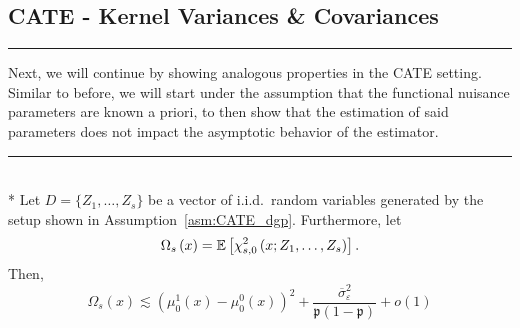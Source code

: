 \subsection{CATE - Kernel Variances \& Covariances}
\hrule
Next, we will continue by showing analogous properties in the CATE setting.
Similar to before, we will start under the assumption that the functional nuisance parameters are known a priori, to then show that the estimation of said parameters does not impact the asymptotic behavior of the estimator.
\vspace{0.5cm}
\hrule

\begin{boxD}
    \begin{lem}\label{lem:CATE_omega_s}\mbox{}\\*
	Let $D = \{Z_1, \dotsc, Z_{s}\}$ be a vector of i.i.d.\ random variables generated by the setup shown in Assumption~\ref{asm:CATE_dgp}.
	Furthermore, let
	\begin{equation}
		\Omega_{s}\left(x\right)
		= \mathbb{E}\left[\chi_{s,0}^{2}\left(x; Z_1, \ldots,  Z_{s}\right)\right].
	\end{equation}
	Then,
	\begin{equation}
		\Omega_{s}\left(x\right)
		\lesssim \left(\mu_{0}^{1}\left(x\right) - \mu_{0}^{0}\left(x\right)\right)^2 + \frac{\overline{\sigma}^2_{\varepsilon}}{\mathfrak{p}\left(1 - \mathfrak{p}\right)} + o(1)
	\end{equation}
\end{lem}
\end{boxD}


